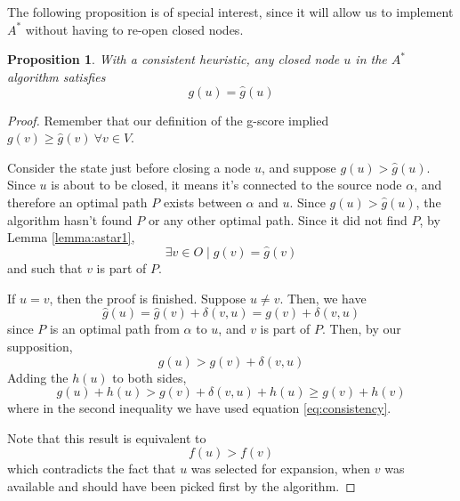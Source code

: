 \documentclass[12pt]{report}
\newtheorem{proposition}[theorem]{Proposition}
\begin{document}
The following proposition is of special interest, since it will allow us to implement $A^*$ without having to re-open closed nodes.

\begin{proposition}
\label{prop:heur1}
With a consistent heuristic, any closed node $u$ in the $A^*$ algorithm satisfies
\[ g(u) = \hat{g}(u) \]
\end{proposition}
\begin{proof}
Remember that our definition of the g-score implied $g(v) \geq \hat{g}(v) \ \forall v \in V$.

Consider the state just before closing a node $u$, and suppose $g(u) > \hat{g}(u)$. Since $u$ is about to be closed, it means it's connected to the source node $\alpha$, and therefore an optimal path $P$ exists between $\alpha$ and $u$. Since $g(u) > \hat{g}(u)$, the algorithm hasn't found $P$ or any other optimal path. Since it did not find $P$, by Lemma \ref{lemma:astar1},
\[ \exists v \in O \mid g(v) = \hat{g}(v) \]
and such that $v$ is part of $P$.

If $u = v$, then the proof is finished. Suppose $u \neq v$. Then, we have
\[ \hat{g}(u) = \hat{g}(v) + \delta(v, u) = g(v) + \delta(v, u) \]
since $P$ is an optimal path from $\alpha$ to $u$, and $v$ is part of $P$. Then, by our supposition,
\[ g(u) > g(v) + \delta(v, u) \]
Adding the $h(u)$ to both sides,
\[ g(u) + h(u) > g(v) + \delta(v, u) + h(u) \geq g(v) + h(v) \]
where in the second inequality we have used equation \ref{eq:consistency}.

Note that this result is equivalent to
\[ f(u) > f(v) \]
which contradicts the fact that $u$ was selected for expansion, when $v$ was available and should have been picked first by the algorithm.
\end{proof}
\end{document}
